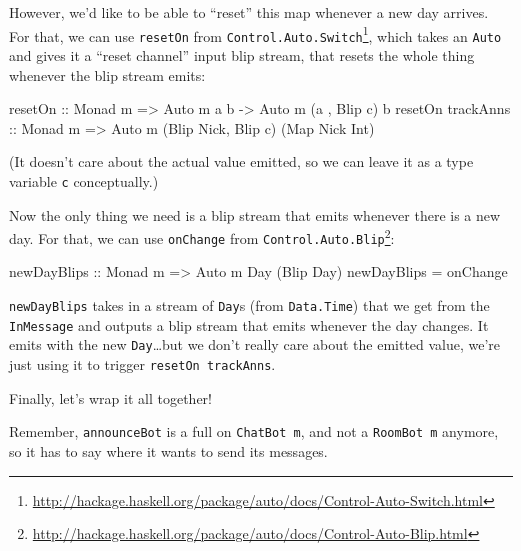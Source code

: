 \documentclass[]{article}
\newenvironment{Shaded}{}{}
\newcommand{\DataTypeTok}[1]{\textcolor[rgb]{0.56,0.13,0.00}{{#1}}}
\newcommand{\OtherTok}[1]{\textcolor[rgb]{0.00,0.44,0.13}{{#1}}}
\newcommand{\FunctionTok}[1]{\textcolor[rgb]{0.02,0.16,0.49}{{#1}}}
\newcommand{\NormalTok}[1]{{#1}}
\renewcommand{\href}[2]{#2\footnote{\url{#1}}}
\begin{document}
However, we'd like to be able to ``reset'' this map whenever a new day
arrives. For that, we can use \texttt{resetOn} from
\href{http://hackage.haskell.org/package/auto/docs/Control-Auto-Switch.html}{\texttt{Control.Auto.Switch}},
which takes an \texttt{Auto} and gives it a ``reset channel'' input blip
stream, that resets the whole thing whenever the blip stream emits:

\begin{Shaded}
\begin{Highlighting}[]
\OtherTok{resetOn ::} \DataTypeTok{Monad} \NormalTok{m }\OtherTok{=>} \DataTypeTok{Auto} \NormalTok{m a b }\OtherTok{->} \DataTypeTok{Auto} \NormalTok{m (a        , }\DataTypeTok{Blip} \NormalTok{c) b}
\NormalTok{resetOn}\OtherTok{ trackAnns ::} \DataTypeTok{Monad} \NormalTok{m }\OtherTok{=>}     \DataTypeTok{Auto} \NormalTok{m (}\DataTypeTok{Blip} \DataTypeTok{Nick}\NormalTok{, }\DataTypeTok{Blip} \NormalTok{c) (}\DataTypeTok{Map} \DataTypeTok{Nick} \DataTypeTok{Int}\NormalTok{)}
\end{Highlighting}
\end{Shaded}

(It doesn't care about the actual value emitted, so we can leave it as a
type variable \texttt{c} conceptually.)

Now the only thing we need is a blip stream that emits whenever there is
a new day. For that, we can use \texttt{onChange} from
\href{http://hackage.haskell.org/package/auto/docs/Control-Auto-Blip.html}{\texttt{Control.Auto.Blip}}:

\begin{Shaded}
\begin{Highlighting}[]
\OtherTok{newDayBlips ::} \DataTypeTok{Monad} \NormalTok{m }\OtherTok{=>} \DataTypeTok{Auto} \NormalTok{m }\DataTypeTok{Day} \NormalTok{(}\DataTypeTok{Blip} \DataTypeTok{Day}\NormalTok{)}
\NormalTok{newDayBlips }\FunctionTok{=} \NormalTok{onChange}
\end{Highlighting}
\end{Shaded}

\texttt{newDayBlips} takes in a stream of \texttt{Day}s (from
\texttt{Data.Time}) that we get from the \texttt{InMessage} and outputs
a blip stream that emits whenever the day changes. It emits with the new
\texttt{Day}\ldots{}but we don't really care about the emitted value,
we're just using it to trigger \texttt{resetOn\ trackAnns}.

Finally, let's wrap it all together!

Remember, \texttt{announceBot} is a full on \texttt{ChatBot\ m}, and not
a \texttt{RoomBot\ m} anymore, so it has to say where it wants to send
its messages.
\end{document}
